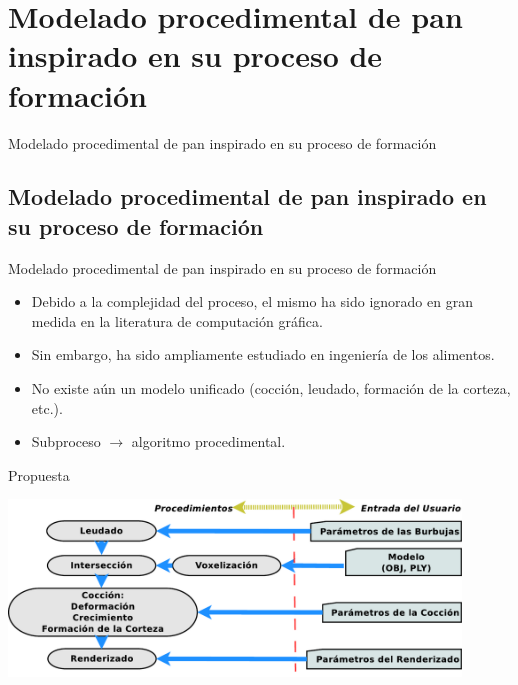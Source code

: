 \documentclass[spanish,unknownkeysallowed]{beamer}
\begin{document}
\section[Modelado de Pan]{Modelado procedimental de pan inspirado en su proceso de formación}


\begin{frame}
\begin{block}{}
\begin{center}
\vspace{1cm}
\huge{Modelado procedimental de pan inspirado en su proceso de formación}
\vspace{1cm}
\end{center}
\end{block}
\end{frame}

\subsection{Modelado procedimental de pan inspirado en su proceso de formación}
\begin{frame}{Modelado procedimental de pan inspirado en su proceso de formación}
\begin{block}{}
\begin{itemize}
\item Debido a la complejidad del proceso, el mismo ha sido ignorado en gran medida en la literatura de computación gráfica.

\item Sin embargo, ha sido ampliamente estudiado en ingeniería de los alimentos.

\item No existe aún un modelo unificado (cocción, leudado, formación de la corteza, etc.).

\item Subproceso $\rightarrow$ algoritmo procedimental.
\end{itemize}
\end{block}
\end{frame}

\begin{frame}{Propuesta}
\centerline{\includegraphics[width=12cm]{../figures/pipeline}}
\end{frame}
\end{document}
